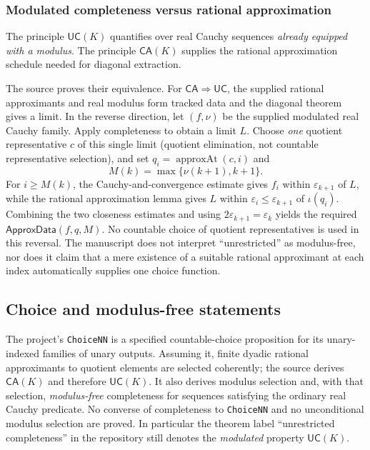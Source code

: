 \documentclass[11pt,reqno]{amsart}
\theoremstyle{definition}\newtheorem{definition}[theorem]{Definition}
\theoremstyle{remark}\newtheorem{remark}[theorem]{Remark}
\newcommand{\eps}{\varepsilon}
\begin{document}
\medskip
\subsubsection*{Modulated completeness versus rational approximation}\label{supp:13-4}
The principle $\mathsf{UC}(K)$ quantifies over real Cauchy sequences \emph{already equipped with a modulus}. The principle $\mathsf{CA}(K)$ supplies the rational approximation schedule needed for diagonal extraction.\par\smallskip The source proves their equivalence. For $\mathsf{CA}\Rightarrow\mathsf{UC}$, the supplied rational approximants and real modulus form tracked data and the diagonal theorem gives a limit. In the reverse direction, let $(f,\nu)$ be the supplied modulated real Cauchy family. Apply completeness to obtain a limit $L$. Choose \emph{one} quotient representative $c$ of this single limit (quotient elimination, not countable representative selection), and set $q_i=\operatorname{approxAt}(c,i)$ and
\[
M(k)=\max\{\nu(k+1),k+1\}.
\]
For $i\ge M(k)$, the Cauchy-and-convergence estimate gives $f_i$ within $\eps_{k+1}$ of $L$, while the rational approximation lemma gives $L$ within $\eps_i\le\eps_{k+1}$ of $\iota(q_i)$. Combining the two closeness estimates and using $2\eps_{k+1}=\eps_k$ yields the required $\mathsf{ApproxData}(f,q,M)$. No countable choice of quotient representatives is used in this reversal. The manuscript does not interpret ``unrestricted'' as modulus-free, nor does it claim that a mere existence of a suitable rational approximant at each index automatically supplies one choice function.
\medskip

\subsection{Choice and modulus-free statements}\label{main:sub-49}
The project's \texttt{ChoiceNN} is a specified countable-choice proposition for its unary-indexed families of unary outputs. Assuming it, finite dyadic rational approximants to quotient elements are selected coherently; the source derives $\mathsf{CA}(K)$ and therefore $\mathsf{UC}(K)$. It also derives modulus selection and, with that selection, \emph{modulus-free} completeness for sequences satisfying the ordinary real Cauchy predicate. No converse of completeness to \texttt{ChoiceNN} and no unconditional modulus selection are proved. In particular the theorem label ``unrestricted completeness'' in the repository still denotes the \emph{modulated} property $\mathsf{UC}(K)$.
\end{document}
